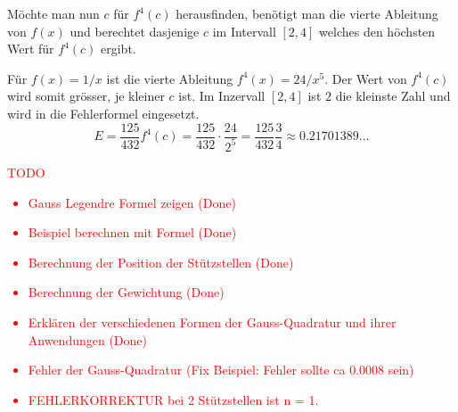 \noindent
Möchte man nun $c$ für $f^{4}(c)$ herausfinden, benötigt man die 
vierte Ableitung von $f(x)$ und berechtet dasjenige $c$ im Intervall $[2, 4]$ 
welches den höchsten Wert für $f^{4}(c)$ ergibt.
\newline

\noindent
Für $f(x) = 1/x$ ist die vierte Ableitung $f^{4}(x) = 24/x^{5}$. 
Der Wert von $f^{4}(c)$ wird somit grösser, je kleiner $c$ ist.
Im Inzervall $[2,4]$ ist $2$ die kleinste Zahl und wird in die Fehlerformel eingesetzt.
\begin{equation}
    E = \frac{125}{432}f^{4}(c) = \frac{125}{432} \cdot \frac{24}{2^{5}} = \frac{125}{432}\frac{3}{4} \approx 0.21701389\dots
\end{equation}


\textcolor{red}{
    TODO
    \begin{itemize}
        \item Gauss Legendre Formel zeigen (Done)
        \item Beispiel berechnen mit Formel (Done)
        \item Berechnung der Position der Stützstellen (Done)
        \item Berechnung der Gewichtung (Done)
        \item Erklären der verschiedenen Formen der Gauss-Quadratur und ihrer Anwendungen (Done)
        \item Fehler der Gauss-Quadratur (Fix Beispiel: Fehler sollte ca 0.0008 sein)
        \item FEHLERKORREKTUR bei 2 Stützstellen ist n = 1. 
    \end{itemize}
}
